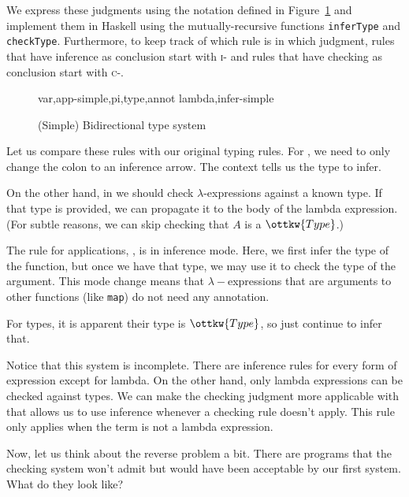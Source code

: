 \documentclass{article}
\theoremstyle{definition}
\begin{document}
We express these judgments using the notation defined in
Figure~\ref{fig:bidirectional} and implement them in Haskell using the
mutually-recursive functions \texttt{inferType} and
\texttt{checkType}. Furthermore, to keep track of which rule is in which
judgment, rules that have inference as conclusion start with
\textsc{i-} and rules that have checking as conclusion start with
\textsc{c-}.

\begin{figure}
{var,app-simple,pi,type,annot}
{lambda,infer-simple}
\caption{(Simple) Bidirectional type system}
\label{fig:bidirectional}
\end{figure}

Let us compare these rules with our original typing rules. For ,
we need to only change the colon to an inference arrow. The context tells us
the type to infer.

On the other hand, in  we should check $\lambda$-expressions
against a known type. If that type is provided, we can propagate it to the
body of the lambda expression. (For subtle reasons, we can skip checking that
$A$ is a $\ottkw{Type}$.)

The rule for applications, , is in inference mode. Here, we
first infer the type of the function, but once we have that type, we may use
it to check the type of the argument. This mode change means that
$\lambda-$expressions that are arguments to other functions (like
\texttt{map}) do not need any annotation.

For types, it is apparent their type is $\ottkw{Type}$, so  just
continue to infer that.

Notice that this system is incomplete. There are inference rules for every
form of expression except for lambda. On the other hand, only lambda
expressions can be checked against types.  We can make the checking judgment
more applicable with  that allows us to use inference
whenever a checking rule doesn't apply. This rule only applies when the 
term is not a lambda expression.

Now, let us think about the reverse problem a bit. There are programs that the
checking system won't admit but would have been acceptable by our first
system. What do they look like?
\end{document}

